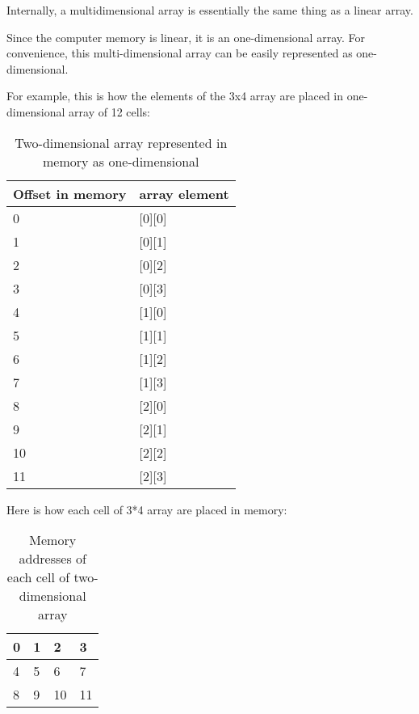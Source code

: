 
Internally, a multidimensional array is essentially the same thing as a linear array.

Since the computer memory is linear, it is an one-dimensional array.
For convenience, this multi-dimensional array can be easily represented as one-dimensional.

For example, this is how the elements of the 3x4 array are placed in one-dimensional array of 12 cells:

\begin{table}[H]
\centering
\begin{tabular}{ | l | l | }
\hline
Offset in memory & array element \\
\hline
0 & [0][0] \\
\hline
1 & [0][1] \\
\hline
2 & [0][2] \\
\hline
3 & [0][3] \\
\hline
4 & [1][0] \\
\hline
5 & [1][1] \\
\hline
6 & [1][2] \\
\hline
7 & [1][3] \\
\hline
8 & [2][0] \\
\hline
9 & [2][1] \\
\hline
10 & [2][2] \\
\hline
11 & [2][3] \\
\hline
\end{tabular}
\caption{Two-dimensional array represented in memory as one-dimensional}
\end{table}

Here is how each cell of 3*4 array are placed in memory:

\begin{table}[H]
\centering
\begin{tabular}{ | l | l | l | l | }
\hline                        
0 & 1 & 2 & 3 \\
\hline  
4 & 5 & 6 & 7 \\
\hline  
8 & 9 & 10 & 11 \\
\hline  
\end{tabular}
\caption{Memory addresses of each cell of two-dimensional array}
\end{table}

